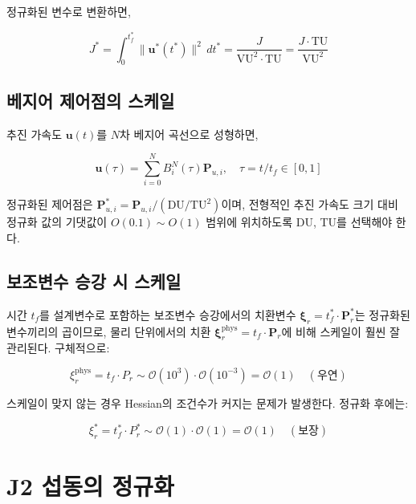 \documentclass[11pt]{article}
\begin{document}
정규화된 변수로 변환하면,

\begin{equation}
  J^* = \int_0^{t_f^*} \|\mathbf{u}^*(t^*)\|^2 \, dt^*
  = \frac{J}{\text{VU}^2 \cdot \text{TU}} = \frac{J \cdot \text{TU}}{\text{VU}^2}
  \label{eq:cost_normalized}
\end{equation}

\subsection{베지어 제어점의 스케일}

추진 가속도 $\mathbf{u}(t)$를 $N$차 베지어 곡선으로 성형하면,

\begin{equation}
  \mathbf{u}(\tau) = \sum_{i=0}^{N} B_i^N(\tau) \mathbf{P}_{u,i}, \quad \tau = t/t_f \in [0,1]
\end{equation}

정규화된 제어점은 $\mathbf{P}_{u,i}^* = \mathbf{P}_{u,i} / (\text{DU}/\text{TU}^2)$이며,
전형적인 추진 가속도 크기 대비 정규화 값의 기댓값이 $O(0.1) \sim O(1)$ 범위에 위치하도록 DU, TU를 선택해야 한다.

\subsection{보조변수 승강 시 스케일}

시간 $t_f$를 설계변수로 포함하는 보조변수 승강에서의 치환변수 $\boldsymbol{\xi}_r = t_f^* \cdot \mathbf{P}_r^*$는
정규화된 변수끼리의 곱이므로, 물리 단위에서의 치환 $\boldsymbol{\xi}_r^{\text{phys}} = t_f \cdot \mathbf{P}_r$에 비해
스케일이 훨씬 잘 관리된다. 구체적으로:

\begin{equation}
  \xi_r^{\text{phys}} = t_f \cdot P_r \sim \mathcal{O}(10^3) \cdot \mathcal{O}(10^{-3}) = \mathcal{O}(1) \quad (\text{우연})
\end{equation}

스케일이 맞지 않는 경우 Hessian의 조건수가 커지는 문제가 발생한다.
정규화 후에는:

\begin{equation}
  \xi_r^* = t_f^* \cdot P_r^* \sim \mathcal{O}(1) \cdot \mathcal{O}(1) = \mathcal{O}(1) \quad (\text{보장})
\end{equation}

\section{J2 섭동의 정규화}
\end{document}
